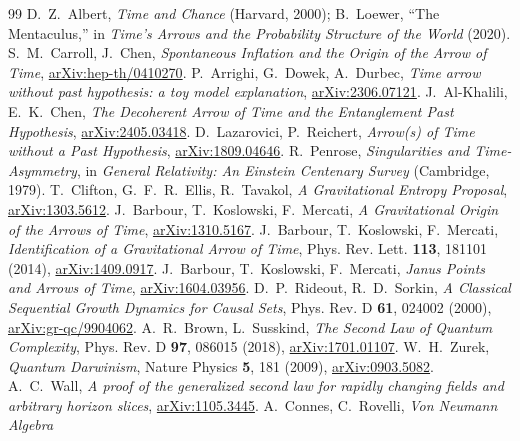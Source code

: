 \documentclass[11pt]{article}
\begin{document}
\begin{thebibliography}{99}
 D.~Z.~Albert, \emph{Time and Chance} (Harvard, 2000);
  B.~Loewer, ``The Mentaculus,'' in \emph{Time's Arrows and the Probability
  Structure of the World} (2020).
 S.~M.~Carroll, J.~Chen, \emph{Spontaneous Inflation and the
  Origin of the Arrow of Time},
  \href{https://arxiv.org/abs/hep-th/0410270}{arXiv:hep-th/0410270}.
 P.~Arrighi, G.~Dowek, A.~Durbec, \emph{Time arrow without past
  hypothesis: a toy model explanation},
  \href{https://arxiv.org/abs/2306.07121}{arXiv:2306.07121}.
 J.~Al-Khalili, E.~K.~Chen, \emph{The Decoherent Arrow of
  Time and the Entanglement Past Hypothesis},
  \href{https://arxiv.org/abs/2405.03418}{arXiv:2405.03418}.
 D.~Lazarovici, P.~Reichert, \emph{Arrow(s) of Time without a
  Past Hypothesis}, \href{https://arxiv.org/abs/1809.04646}{arXiv:1809.04646}.
 R.~Penrose, \emph{Singularities and Time-Asymmetry}, in
  \emph{General Relativity: An Einstein Centenary Survey} (Cambridge, 1979).
 T.~Clifton, G.~F.~R.~Ellis, R.~Tavakol, \emph{A Gravitational
  Entropy Proposal}, \href{https://arxiv.org/abs/1303.5612}{arXiv:1303.5612}.
 J.~Barbour, T.~Koslowski, F.~Mercati, \emph{A Gravitational
  Origin of the Arrows of Time},
  \href{https://arxiv.org/abs/1310.5167}{arXiv:1310.5167}.
 J.~Barbour, T.~Koslowski, F.~Mercati, \emph{Identification of a
  Gravitational Arrow of Time}, Phys. Rev. Lett. \textbf{113}, 181101 (2014),
  \href{https://arxiv.org/abs/1409.0917}{arXiv:1409.0917}.
 J.~Barbour, T.~Koslowski, F.~Mercati, \emph{Janus Points and
  Arrows of Time}, \href{https://arxiv.org/abs/1604.03956}{arXiv:1604.03956}.
 D.~P.~Rideout, R.~D.~Sorkin, \emph{A Classical Sequential
  Growth Dynamics for Causal Sets}, Phys. Rev. D \textbf{61}, 024002 (2000),
  \href{https://arxiv.org/abs/gr-qc/9904062}{arXiv:gr-qc/9904062}.
 A.~R.~Brown, L.~Susskind, \emph{The Second Law of Quantum
  Complexity}, Phys. Rev. D \textbf{97}, 086015 (2018),
  \href{https://arxiv.org/abs/1701.01107}{arXiv:1701.01107}.
 W.~H.~Zurek, \emph{Quantum Darwinism}, Nature Physics
  \textbf{5}, 181 (2009), \href{https://arxiv.org/abs/0903.5082}{arXiv:0903.5082}.
 A.~C.~Wall, \emph{A proof of the generalized second law for
  rapidly changing fields and arbitrary horizon slices},
  \href{https://arxiv.org/abs/1105.3445}{arXiv:1105.3445}.
 A.~Connes, C.~Rovelli, \emph{Von Neumann Algebra
}
\end{thebibliography}
\end{document}
